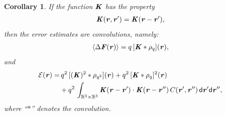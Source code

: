 \documentclass[aps,pre,preprint,unsortedaddress]{revtex4}
\renewcommand{\v}[1]{\textbf{\textit{#1}}}
\renewcommand{\d}[1]{\textsf{#1}}
\newtheorem{corollary}[theorem]{Corollary}
\begin{document}
\begin{corollary}\label{thm:tmp2}
  If the function $\v K$ has the property
  \begin{align}
    \label{eqn:cor-kernel}
    \v K(\v r,\v r') = \v K(\v r - \v r'),    
  \end{align}
  then the error estimates are convolutions, namely:
  \begin{align}\label{eqn:cor-meanf}
    \langle\Delta\v F(\v r)\rangle
    =q\, [\v K\ast\rho_q](\v r),
  \end{align}
  and 
  \begin{align}\nonumber
    \mathcal E (\v r) 
    = &\,
    q^2\,[(\v K)^2\ast\rho_{q^2}] (\v r) + 
    q^2\,[\v K\ast\rho_{q}]^2 (\v r) \\\label{eqn:cor-error}
    &+
    q^2\,\int_{\mathbb R^3\times\mathbb R^3}
    \v K(\v r-\v r')\cdot
    \v K(\v r-\v r'')\,
    C(\v r', \v r'')\,
    \d d\v r'\d d\v r'',
  \end{align}
  where ``$\ast$'' denotes the convolution.
\end{corollary}
\end{document}
